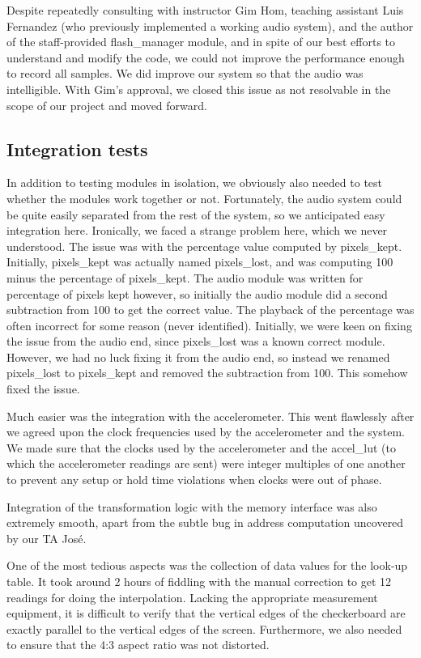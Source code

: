 \documentclass{article}
\begin{document}
Despite repeatedly consulting with instructor Gim Hom, teaching assistant Luis Fernandez (who previously implemented a working audio system), and the author of the staff-provided flash\_manager module,
and in spite of our best efforts to understand and modify the code,
we could not improve the performance enough to record all samples.
We did improve our system so that the audio was intelligible.
With Gim's approval, we closed this issue as not resolvable in the scope of our project and moved forward.

\subsection{Integration tests}
In addition to testing modules in isolation, we obviously also needed to test whether the modules work together or not.
Fortunately, the audio system could be quite easily separated from the rest of the system, so we anticipated easy integration here.
Ironically, we faced a strange problem here, which we never understood.
The issue was with the percentage value computed by pixels\_kept.
Initially, pixels\_kept was actually named pixels\_lost, and was computing 100 minus the percentage of pixels\_kept.
The audio module was written for percentage of pixels kept however,
so initially the audio module did a second subtraction from 100 to get the correct value.
The playback of the percentage was often incorrect for some reason (never identified).
Initially, we were keen on fixing the issue from the audio end, since pixels\_lost was a known correct module.
However, we had no luck fixing it from the audio end, so instead we renamed pixels\_lost to pixels\_kept and removed the subtraction from 100.
This somehow fixed the issue.

Much easier was the integration with the accelerometer.
This went flawlessly after we agreed upon the clock frequencies used by the accelerometer and the system. We made sure that the clocks used by the accelerometer and the accel\_lut (to which the accelerometer readings are sent) were integer multiples of one another to prevent any setup or hold time violations when clocks were out of phase.

Integration of the transformation logic with the memory interface was also extremely smooth,
apart from the subtle bug in address computation uncovered by our TA Jos\'{e}.

One of the most tedious aspects was the collection of data values for the look-up table.
It took around 2 hours of fiddling with the manual correction to get 12 readings for doing the interpolation.
Lacking the appropriate measurement equipment,
it is difficult to verify that the vertical edges of the checkerboard are exactly parallel to the vertical edges of the screen.
Furthermore, we also needed to ensure that the 4:3 aspect ratio was not distorted.
\end{document}

